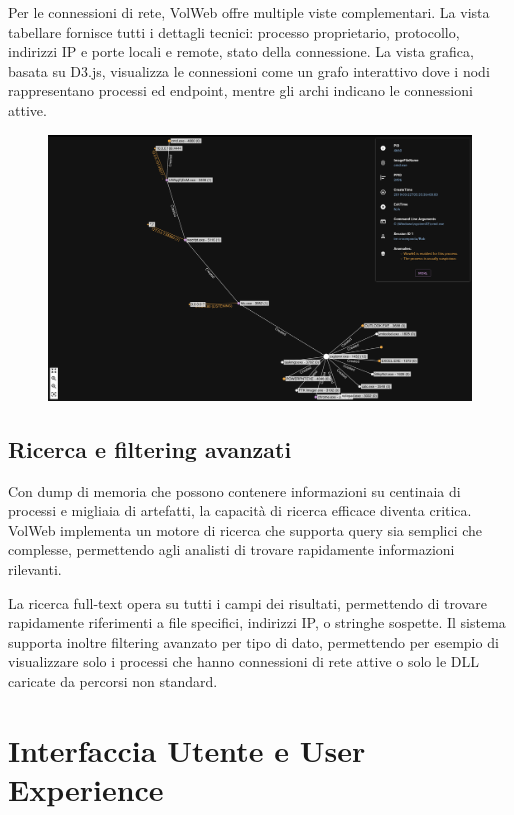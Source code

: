 Per le connessioni di rete, VolWeb offre multiple viste complementari. La vista tabellare fornisce tutti i dettagli tecnici: processo proprietario, protocollo, indirizzi IP e porte locali e remote, stato della connessione. La vista grafica, basata su D3.js, visualizza le connessioni come un grafo interattivo dove i nodi rappresentano processi ed endpoint, mentre gli archi indicano le connessioni attive.

\begin{figure}[H]
    \centering
    \includegraphics[width=0.9\linewidth]{images/volweb-original/volweb-network-graph.png}
\end{figure}

\subsection{Ricerca e filtering avanzati}

Con dump di memoria che possono contenere informazioni su centinaia di processi e migliaia di artefatti, la capacità di ricerca efficace diventa critica. VolWeb implementa un motore di ricerca che supporta query sia semplici che complesse, permettendo agli analisti di trovare rapidamente informazioni rilevanti.

La ricerca full-text opera su tutti i campi dei risultati, permettendo di trovare rapidamente riferimenti a file specifici, indirizzi IP, o stringhe sospette. Il sistema supporta inoltre filtering avanzato per tipo di dato, permettendo per esempio di visualizzare solo i processi che hanno connessioni di rete attive o solo le DLL caricate da percorsi non standard.

\section{Interfaccia Utente e User Experience}

